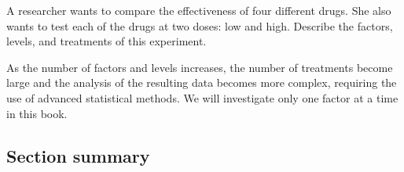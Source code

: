 \begin{exercisewrap}
\begin{nexercise}A researcher wants to compare the effectiveness of four different drugs. She also wants to test each of the drugs at two doses: low and high. Describe the factors, levels, and treatments of this experiment.\footnotemark
\end{nexercise}
\end{exercisewrap}

As the number of factors and levels increases, the number of treatments become large and the analysis of the resulting data becomes more complex, requiring the use of advanced statistical methods. We will investigate only one factor at a time in this book.


\D{\newpage}

\subsection*{Section summary}

